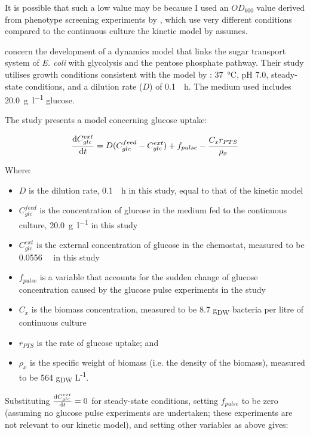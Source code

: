 \documentclass[a4paper]{scrartcl}
\begin{document}
It is possible that such a low value may be because I used an $OD_{600}$ value derived from phenotype screening experiments by \citet{orth_comprehensive_2011}, which use very different conditions compared to the continuous culture the kinetic model by \citet{millard_metabolic_2017} assumes.

\citet{chassagnole_dynamic_2002} concern the development of a dynamics model that links the sugar transport system of \emph{E. coli} with glycolysis and the pentose phosphate pathway.  Their study utilises growth conditions consistent with the model by \citet{millard_metabolic_2017}: \SI{37}{\celsius}, pH 7.0, steady-state conditions, and a dilution rate ($D$) of \SI{0.1}{\per\hour}.  The medium used includes \SI{20.0}{\gram\per\litre} glucose.

The study presents a model concerning glucose uptake:

\[
  \dv{C_{glc}^{ext}}{t} = D(C_{glc}^{feed} - C_{glc}^{ext}) + f_{pulse} - \frac{C_{x}r_{PTS}}{\rho_{x}}
\]

Where:

\begin{itemize}
\item $D$ is the dilution rate, \SI{0.1}{\per\hour} in this study, equal to that of the kinetic model
\item $C_{glc}^{feed}$ is the concentration of glucose in the medium fed to the continuous culture, \SI{20.0}{\gram\per\litre} in this study
\item $C_{glc}^{ext}$ is the external concentration of glucose in the chemostat, measured to be \SI{0.0556}{\milli\Molar} in this study
\item $f_{pulse}$ is a variable that accounts for the sudden change of glucose concentration caused by the glucose pulse experiments in the study
\item $C_{x}$ is the biomass concentration, measured to be 8.7 g\textsubscript{DW} bacteria per litre of continuous culture
\item $r_{PTS}$ is the rate of glucose uptake; and
  \item $\rho_{x}$ is the specific weight of biomass (i.e. the density of the biomass), measured to be 564 g\textsubscript{DW} L\textsuperscript{-1}.
  \end{itemize}

  Substituting $\dv{C_{glc}^{ext}}{t} = 0$ for steady-state conditions, setting $f_{pulse}$ to be zero (assuming no glucose pulse experiments are undertaken; these experiments are not relevant to our kinetic model), and setting other variables as above gives:
\end{document}
